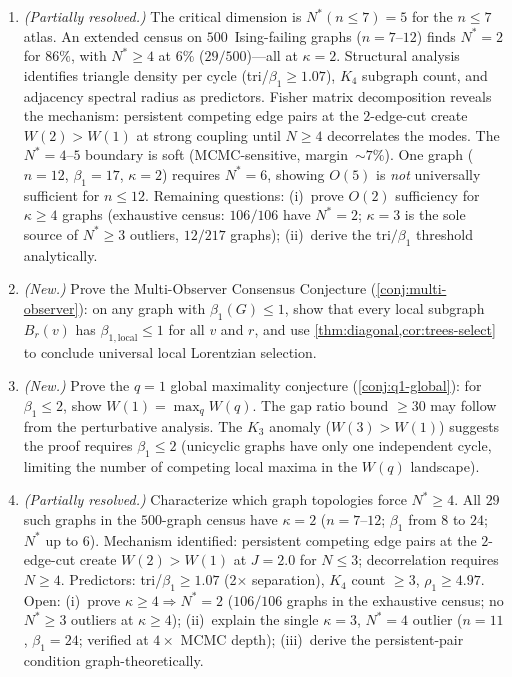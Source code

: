 \documentclass[11pt]{article}
\theoremstyle{definition}
\theoremstyle{remark}
\begin{document}
\begin{enumerate}
  \item \emph{(Partially resolved.)} The critical dimension is
    $N^*(n \leq 7) = 5$ for the $n \leq 7$ atlas.  An extended census on
    $500$~Ising-failing graphs ($n = 7$--$12$) finds $N^* = 2$ for $86\%$,
    with $N^* \geq 4$ at $6\%$ ($29/500$)---all at $\kappa = 2$.
    Structural analysis identifies triangle density per cycle
    (tri/$\beta_1 \geq 1.07$), $K_4$ subgraph count, and adjacency
    spectral radius as predictors.
    Fisher matrix decomposition reveals the mechanism: persistent
    competing edge pairs at the $2$-edge-cut create $W(2) > W(1)$
    at strong coupling until $N \geq 4$ decorrelates the modes.
    The $N^* = 4$--$5$ boundary is soft (MCMC-sensitive, margin~${\sim}7\%$).
    One graph ($n = 12$, $\beta_1 = 17$, $\kappa = 2$) requires $N^* = 6$,
    showing $O(5)$ is \emph{not} universally sufficient for $n \leq 12$.
    Remaining questions: (i)~prove $O(2)$ sufficiency for $\kappa \geq 4$
    graphs (exhaustive census: $106/106$ have $N^* = 2$; $\kappa = 3$
    is the sole source of $N^* \geq 3$ outliers, $12/217$ graphs);
    (ii)~derive the $\mathrm{tri}/\beta_1$ threshold analytically.

  \item \emph{(New.)} Prove the Multi-Observer Consensus Conjecture
    (\cref{conj:multi-observer}): on any graph with $\beta_1(G) \leq 1$,
    show that every local subgraph $B_r(v)$ has $\beta_{1,\mathrm{local}} \leq 1$
    for all $v$ and $r$, and use \cref{thm:diagonal,cor:trees-select}
    to conclude universal local Lorentzian selection.

  \item \emph{(New.)} Prove the $q{=}1$ global maximality conjecture
    (\cref{conj:q1-global}): for $\beta_1 \leq 2$, show $W(1) = \max_q W(q)$.
    The gap ratio bound $\geq 30$ may follow from the perturbative analysis.
    The $K_3$ anomaly ($W(3) > W(1)$) suggests the proof requires
    $\beta_1 \leq 2$ (unicyclic graphs have only one independent cycle,
    limiting the number of competing local maxima in the $W(q)$ landscape).

  \item \emph{(Partially resolved.)} Characterize which graph topologies
    force $N^* \geq 4$.
    All $29$ such graphs in the $500$-graph census have $\kappa = 2$
    ($n = 7$--$12$; $\beta_1$ from $8$ to $24$; $N^*$ up to $6$).
    Mechanism identified: persistent competing edge pairs at the $2$-edge-cut
    create $W(2) > W(1)$ at $J = 2.0$ for $N \leq 3$; decorrelation requires
    $N \geq 4$.  Predictors: tri/$\beta_1 \geq 1.07$ (2$\times$ separation),
    $K_4$ count $\geq 3$, $\rho_1 \geq 4.97$.
    Open: (i)~prove $\kappa \geq 4 \Rightarrow N^* = 2$
    ($106/106$ graphs in the exhaustive census; no $N^* \geq 3$ outliers
    at $\kappa \geq 4$); (ii)~explain the single $\kappa = 3$, $N^* = 4$
    outlier ($n = 11$, $\beta_1 = 24$; verified at $4\times$ MCMC depth);
    (iii)~derive the persistent-pair condition graph-theoretically.


\end{enumerate}
\end{document}
